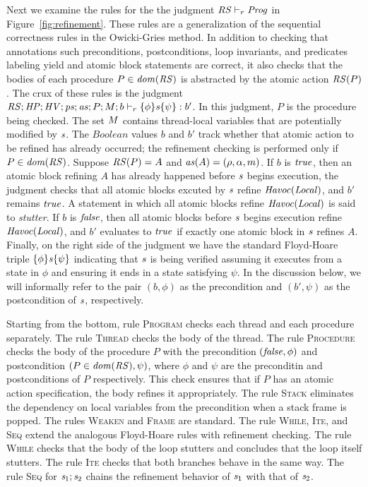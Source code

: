 Next we examine the rules for the the judgment $\mathit{RS} \vdash_r \mathit{Prog}$ in Figure~\ref{fig:refinement}.
These rules are a generalization of the sequential correctness rules in the Owicki-Gries method.
In addition to checking that annotations such preconditions, postconditions, loop invariants, 
and predicates labeling yield and atomic block statements are correct, it also checks that the bodies
of each procedure $P \in \mathit{dom}(\mathit{RS})$ is abstracted by the atomic action $\mathit{RS}(P)$.
The crux of these rules is the judgment $\mathit{RS};\mathit{HP};\mathit{HV};\mathit{ps};\mathit{as};P;M;b \vdash_r \{\phi\} \mathit{s} \{\psi\} : b'$.
In this judgment, $P$ is the procedure being checked.
The set $M$ contains thread-local variables that are potentially modified by $\mathit{s}$.
The $\mathit{Boolean}$ values $b$ and $b'$ track whether that atomic action to be refined has already occurred;
the refinement checking is performed only if $P \in \mathit{dom}(\mathit{RS})$.
Suppose $\mathit{RS}(P) = A$ and $\mathit{as}(A) = (\rho, \alpha, m)$.
If $b$ is $\mathit{true}$, then an atomic block refining $A$ has already happened before $\mathit{s}$ begins execution, 
the judgment checks that all atomic blocks excuted by $\mathit{s}$ refine $\mathit{Havoc}(\mathit{Local})$, and $b'$ remains $\mathit{true}$.
A statement in which all atomic blocks refine $\mathit{Havoc}(\mathit{Local})$ is said to {\em stutter}.
If $b$ is $\mathit{false}$, then all atomic blocks before $\mathit{s}$ begins execution refine $\mathit{Havoc}(\mathit{Local})$,
and $b'$ evaluates to $\mathit{true}$ if exactly one atomic block in $\mathit{s}$ refines $A$.
Finally, on the right side of the judgment we have the standard Floyd-Hoare triple $\{\phi\} \mathit{s} \{\psi\}$ 
indicating that $\mathit{s}$ is being verified assuming it executes from a state in $\phi$ and ensuring it ends in a state satisfying $\psi$.
In the discussion below, we will informally refer to the pair $(b,\phi)$ as the precondition and $(b',\psi)$
as the postcondition of $\mathit{s}$, respectively.

Starting from the bottom, rule \textsc{Program} checks each thread and each procedure separately.
The rule \textsc{Thread} checks the body of the thread.
The rule \textsc{Procedure} checks the body of the procedure $P$ with
the precondition $(\mathit{false},\phi)$ and postcondition $(P \in \mathit{dom}(\mathit{RS}),\psi)$,
where $\phi$ and $\psi$ are the preconditin and postconditions of $P$ respectively.
This check ensures that if $P$ has an atomic action specification, the body refines it appropriately.
The rule \textsc{Stack} eliminates the dependency on local variables from the precondition when a stack frame is popped.
The rules \textsc{Weaken} and \textsc{Frame} are standard.
The rule \textsc{While}, \textsc{Ite}, and \textsc{Seq} extend the analogous Floyd-Hoare rules with refinement checking.
The rule \textsc{While} checks that the body of the loop stutters and concludes that the loop itself stutters.
The rule \textsc{Ite} checks that both branches behave in the same way.
The rule \textsc{Seq} for $\mathit{s}_1;\mathit{s}_2$ chains the refinement behavior of $\mathit{s}_1$ with that of $\mathit{s}_2$.

